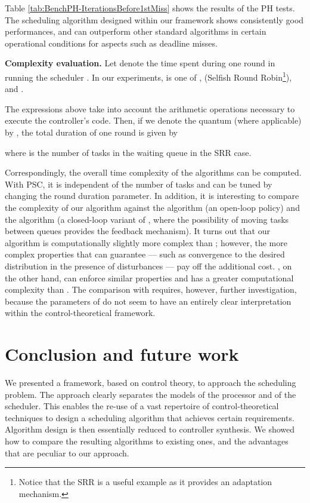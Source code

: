 \documentclass[a4paper]{article}
\begin{document}
Table \ref{tab:BenchPH-IterationsBefore1stMiss} shows the results of the PH
tests. The scheduling algorithm designed within our framework shows consistently
good performances, and can outperform other standard algorithms in certain 
operational conditions for aspects such as deadline misses.



\textbf{Complexity evaluation.}
Let  denote the time spent during one round in running the
scheduler .
In our experiments,  is one of ,  (Selfish
Round Robin\footnote{Notice that the SRR is a useful example as it provides an adaptation mechanism.}), 
and .

\begin{small}

\end{small}

The expressions above take into account the arithmetic
operations necessary to execute the controller's code.
Then, if we denote the quantum (where applicable) by , the total duration 
of one round is given by

\begin{small}

\end{small}

\noindent where  is the number of tasks in the waiting queue in the
SRR case.

Correspondingly, the overall time complexity of the algorithms can be computed.
With PSC, it is independent of the number of tasks and can be tuned by changing
the round duration parameter.
In addition, it is interesting to compare the complexity of our  algorithm against the  algorithm (an open-loop policy) and the  algorithm (a closed-loop variant of , where the possibility of moving tasks between queues provides the feedback mechanism).
It turns out that our  algorithm is computationally slightly more complex than ; however, the more complex properties that  can guarantee --- such as convergence to the desired distribution in the presence of disturbances --- pay off the additional cost.
, on the other hand, can enforce similar properties and has a greater computational complexity than .
The comparison with  requires, however, further investigation, because the parameters of  do not seem to have an entirely clear interpretation within the control-theoretical framework.



\section{Conclusion and future work}
\label{sec:conclusions}
We presented a framework, based on control theory, to approach the scheduling
problem. The approach clearly separates the models of the processor and of the
scheduler. This enables the re-use of a vast repertoire of control-theoretical
techniques to design a scheduling algorithm that achieves certain requirements.
Algorithm design is then essentially reduced to controller synthesis.
We showed how to compare the resulting algorithms to existing ones, and the 
advantages that are peculiar to our approach.
\end{document}

